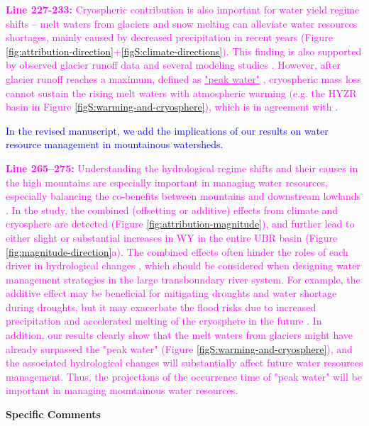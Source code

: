 \documentclass[11pt]{article}
\newcommand{\sect}[1]{{\bigskip \bigskip \textbf{\noindent #1} }} %
\newcommand{\nextreply}[1]{\bigskip \textcolor{blue}{\noindent #1}}
\newcommand{\revised}[3][2]{\bigskip \textcolor{magenta}{\noindent \textbf{Line #2:} #3}}
\begin{document}
\revised{227-233}{Cryospheric contribution is also important for water yield regime shifts -- melt waters from glaciers and snow melting can alleviate water resources shortages, mainly caused by decreased precipitation in recent years (Figure \ref{fig:attribution-direction}+\ref{figS:climate-directions}). This finding is also supported by observed glacier runoff data \citep{yao2010glacial} and several modeling studies \citep{lutz2014consistent, Zhang2020VariationOM, wang2021tp}. 
However, after glacier runoff reaches a maximum, defined as \ul{"peak water"} \citep{gleick2010peak}, cryospheric mass loss cannot sustain the rising melt waters with atmospheric warming (e.g. the HYZR basin in Figure \ref{figS:warming-and-cryosphere}), which is in agreement with \citet{huss2018global}.}

\nextreply{In the revised manuscript, we add the implications of our results on water resource management in mountainous watersheds.}

\revised{265--275}{Understanding the hydrological regime shifts and their causes in the high mountains are especially important in managing water resources, especially balancing the co-benefits between mountains and downstream lowlands \citep{viviroli2011climate}. 
In the study, the combined (offsetting or additive) effects from climate and cryosphere are detected (Figure \ref{fig:attribution-magnitude}), and further lead to either slight or substantial increases in WY in the entire UBR basin (Figure \ref{fig:magnitude-direction}a). 
The combined effects often hinder the roles of each driver in hydrological changes \citep{wei2018,zhang2021deforestation}, which should be considered when designing water management strategies in the large transboundary river system.
For example, the additive effect may be beneficial for mitigating droughts and water shortage during droughts, but it may exacerbate the flood risks due to increased precipitation and accelerated melting of the cryosphere in the future \citep{Immerzeel2013}.
In addition, our results clearly show that the melt waters from glaciers might have already surpassed the "peak water"  (Figure \ref{figS:warming-and-cryosphere}), and the associated hydrological changes will substantially affect future water resources management. Thus, the projections of the occurrence time of "peak water" will be important in managing mountainous water resources.}

\sect{Specific Comments}
\end{document}
